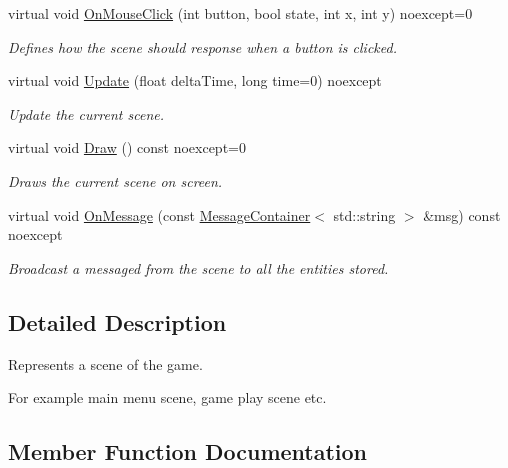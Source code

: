 \begin{DoxyCompactItemize}
\mbox{\label{class_blade_1_1_scene_ab54558db189ce57505ede242ffc303d2}} 
virtual void \hyperlink{class_blade_1_1_scene_ab54558db189ce57505ede242ffc303d2}{On\+Mouse\+Click} (int button, bool state, int x, int y) noexcept=0
\begin{DoxyCompactList}\small\item\em Defines how the scene should response when a button is clicked. \end{DoxyCompactList}\item 
\mbox{\label{class_blade_1_1_scene_a657797f1b08ac81bea28a2f9ed0e9c6f}} 
virtual void \hyperlink{class_blade_1_1_scene_a657797f1b08ac81bea28a2f9ed0e9c6f}{Update} (float delta\+Time, long time=0) noexcept
\begin{DoxyCompactList}\small\item\em Update the current scene. \end{DoxyCompactList}\item 
\mbox{\label{class_blade_1_1_scene_ad1e610e1b5ea1cc4c6eaeac74e1c365b}} 
virtual void \hyperlink{class_blade_1_1_scene_ad1e610e1b5ea1cc4c6eaeac74e1c365b}{Draw} () const noexcept=0
\begin{DoxyCompactList}\small\item\em Draws the current scene on screen. \end{DoxyCompactList}\item 
virtual void \hyperlink{class_blade_1_1_scene_ac49cdbb30d13096320971ef9389d0a54}{On\+Message} (const \hyperlink{class_blade_1_1_ref_counted_container}{Message\+Container}$<$ std\+::string $>$ \&msg) const noexcept
\begin{DoxyCompactList}\small\item\em Broadcast a messaged from the scene to all the entities stored. \end{DoxyCompactList}\end{DoxyCompactItemize}


\subsection{Detailed Description}
Represents a scene of the game. 

For example main menu scene, game play scene etc. 

\subsection{Member Function Documentation}
\mbox{\label{class_blade_1_1_scene_a0f17cd32cb502502fd5a3a39c72b4856}} 
